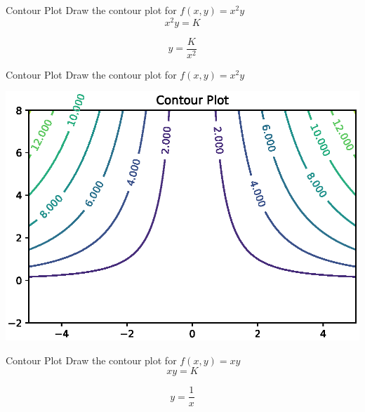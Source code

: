 \documentclass{beamer}
\begin{document}
\begin{frame}{Contour Plot}
    Draw the contour plot for $f(x,y) = x^{2}y$\\
    \begin{equation*}
        x^{2}y = K
    \end{equation*}
    
    \begin{equation*}
        y = \frac{K}{x^{2}}
    \end{equation*}
\end{frame}

\begin{frame}{Contour Plot}
    Draw the contour plot for $f(x,y) = x^{2}y$\\
    \begin{center}
     \includegraphics[totalheight=6cm]{ml-maths/contour-plot-4.eps}
 \end{center}
\end{frame}


\begin{frame}{Contour Plot}
    Draw the contour plot for $f(x,y) = xy$\\
    \begin{equation*}
        xy = K
    \end{equation*}
    
    \begin{equation*}
        y = \frac{1}{x}
    \end{equation*}
\end{frame}
\end{document}
